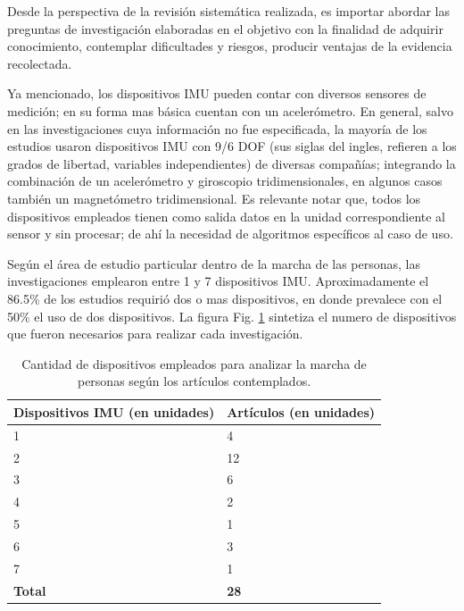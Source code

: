 Desde la perspectiva de la revisión sistemática realizada, es importar abordar las preguntas de investigación elaboradas en el objetivo con la finalidad de adquirir conocimiento, contemplar dificultades y riesgos, producir ventajas de la evidencia recolectada.

Ya mencionado, los dispositivos IMU pueden contar con diversos sensores de medición; en su forma mas básica cuentan con un acelerómetro. En general, salvo en las investigaciones cuya información no fue especificada, la mayoría de los estudios usaron dispositivos IMU con 9/6 DOF (sus siglas del ingles, refieren a los grados de libertad, variables independientes) de diversas compañías; integrando la combinación de un acelerómetro y giroscopio tridimensionales, en algunos casos también un magnetómetro tridimensional. Es relevante notar que, todos los dispositivos empleados tienen como salida datos en la unidad correspondiente al sensor y sin procesar; de ahí la necesidad de algoritmos específicos al caso de uso.

Según el área de estudio particular dentro de la marcha de las personas, las investigaciones emplearon entre 1 y 7 dispositivos IMU. Aproximadamente el 86.5\% de los estudios requirió dos o mas dispositivos, en donde prevalece con el 50\% el uso de dos dispositivos. La figura Fig. \ref{fig:synthesis_devices} sintetiza el numero de dispositivos que fueron necesarios para realizar cada investigación.

\begin{table}[H] 
\caption{Cantidad de dispositivos empleados para analizar la marcha de personas según los artículos contemplados.}
\centering
\begin{tabular}{| p{4cm} | p{4cm} |}
\hline
\textbf{Dispositivos IMU (en unidades)} & \textbf{Artículos (en unidades)}\\ \hline
1 & 4\\ \hline
2 & 12\\ \hline
3 & 6 \\ \hline
4 & 2 \\ \hline
5 & 1 \\ \hline
6 & 3 \\ \hline
7 & 1 \\ \hline
\textbf{Total} & \textbf{28}\\ \hline
\end{tabular}
 \label{fig:synthesis_devices}
\end{table}

